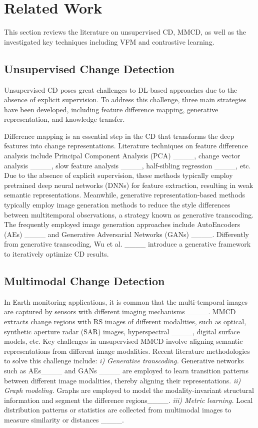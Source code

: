 \section{Related Work}
\label{sc2}

This section reviews the literature on unsupervised CD, MMCD, as well as the investigated key techniques including VFM and contrastive learning.

\subsection{Unsupervised Change Detection}

Unsupervised CD poses great challenges to DL-based approaches due to the absence of explicit supervision. To address this challenge, three main strategies have been developed, including feature difference mapping, generative representation, and knowledge transfer.

Difference mapping is an essential step in the CD that transforms the deep features into change representations. Literature techniques on feature difference analysis include Principal Component Analysis (PCA) ____, change vector analysis ____, slow feature analysis ____, half-sibling regression ____, etc. Due to the absence of explicit supervision, these methods typically employ pretrained deep neural networks (DNNs) for feature extraction, resulting in weak semantic representations. Meanwhile, generative representation-based methods typically employ image generation methods to reduce the style differences between multitemporal observations, a strategy known as generative transcoding. The frequently employed image generation approaches include AutoEncoders (AEs) ____ and Generative Adversarial Networks (GANs) ____. Differently from generative transcoding, Wu et al. ____ introduce a generative framework to iteratively optimize CD results. 

\subsection{Multimodal Change Detection}

In Earth monitoring applications, it is common that the multi-temporal images are captured by sensors with different imaging mechanisms ____. MMCD extracts change regions with RS images of different modalities, such as optical, synthetic aperture radar (SAR) images, hyperspectral ____, digital surface models, etc. Key challenges in unsupervised MMCD involve aligning semantic representations from different image modalities. Recent literature methodologies to solve this challenge include: \textit{i) Generative transcoding.} Generative networks such as AEs____ and GANs ____ are employed to learn transition patterns between different image modalities, thereby aligning their representations. \textit{ii) Graph modeling.} Graphs are employed to model the modality-invariant structural information and segment the difference regions____. \textit{iii) Metric learning.} Local distribution patterns or statistics are collected from multimodal images to measure similarity or distances ____. 

